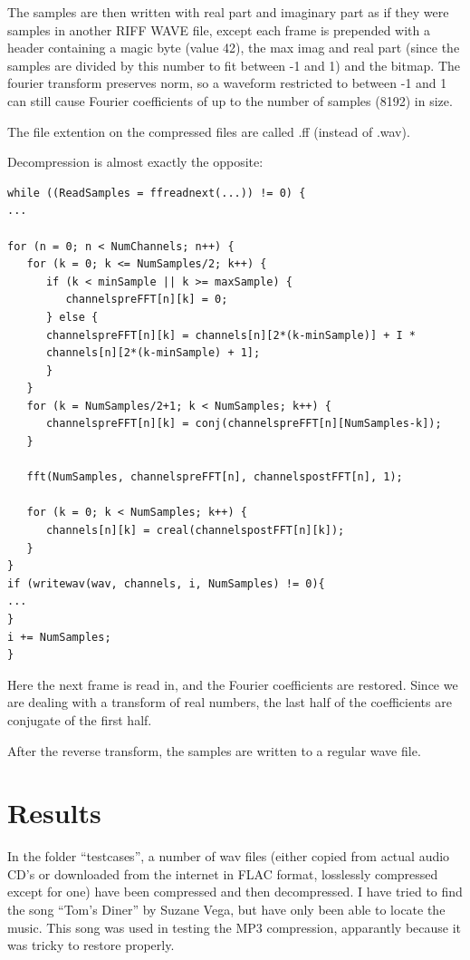 \documentclass[a4paper,11pt]{article}
\begin{document}
The samples are then written with real part and imaginary part
as if they were samples in another RIFF WAVE file,
except each frame is prepended with a header containing
a magic byte (value 42), the max imag and real part (since the samples are divided
by this number to fit between -1 and 1) and the bitmap.
The fourier transform preserves norm, so a waveform
restricted to between -1 and 1 can still cause Fourier coefficients
of up to the number of samples (8192) in size.

The file extention on the compressed files are called .ff (instead of .wav).

Decompression is almost exactly the opposite:

\begin{lstlisting}
while ((ReadSamples = ffreadnext(...)) != 0) {
...

for (n = 0; n < NumChannels; n++) {
   for (k = 0; k <= NumSamples/2; k++) {
      if (k < minSample || k >= maxSample) {
         channelspreFFT[n][k] = 0;
      } else {
      channelspreFFT[n][k] = channels[n][2*(k-minSample)] + I *
      channels[n][2*(k-minSample) + 1];
      }
   }
   for (k = NumSamples/2+1; k < NumSamples; k++) {
      channelspreFFT[n][k] = conj(channelspreFFT[n][NumSamples-k]);
   }

   fft(NumSamples, channelspreFFT[n], channelspostFFT[n], 1);

   for (k = 0; k < NumSamples; k++) {
      channels[n][k] = creal(channelspostFFT[n][k]);
   }
}
if (writewav(wav, channels, i, NumSamples) != 0){
...
}
i += NumSamples;
}
\end{lstlisting}

Here the next frame is read in, and the Fourier coefficients are restored.
Since we are dealing with a transform of real numbers, the last
half of the coefficients are conjugate of the first half.

After the reverse transform, the samples are written to a regular wave file.

\section{Results}

In the folder ``testcases'', a number of wav files (either copied from actual audio
CD's or downloaded from the internet in FLAC format, losslessly compressed except
for one)
have been compressed and then decompressed. I have tried to find
the song ``Tom's Diner'' by Suzane Vega, but have only
been able to locate the music.
This song was used in testing the MP3 compression, apparantly
because it was tricky to restore properly.
\end{document}
